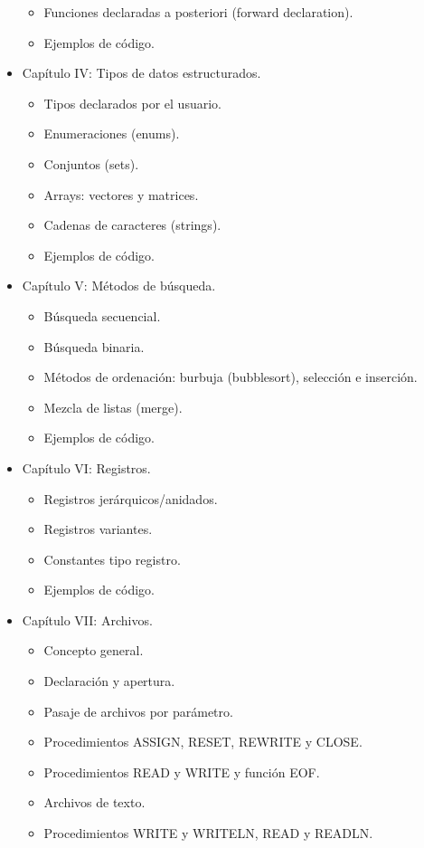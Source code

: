 \documentclass{article}
\begin{document}
\begin{itemize}
\begin{itemize}
	\item Funciones declaradas a posteriori (forward declaration).
	\item Ejemplos de código.
	\end{itemize}	
\item Capítulo IV: Tipos de datos estructurados.
	\begin{itemize}
	\item Tipos declarados por el usuario.
	\item Enumeraciones (enums).
	\item Conjuntos (sets).
	\item Arrays: vectores y matrices.
	\item Cadenas de caracteres (strings).
	\item Ejemplos de código.
	\end{itemize}
\item Capítulo V: Métodos de búsqueda.
	\begin{itemize}
	\item Búsqueda secuencial.
	\item Búsqueda binaria.
	\item Métodos de ordenación: burbuja (bubblesort), selección e inserción.
	\item Mezcla de listas (merge).
	\item Ejemplos de código.
	\end{itemize}
\item Capítulo VI: Registros.
	\begin{itemize}
	\item Registros jerárquicos/anidados.
	\item Registros variantes.
	\item Constantes tipo registro.
	\item Ejemplos de código.
	\end{itemize}
\item Capítulo VII: Archivos.
	\begin{itemize}
	\item Concepto general.
	\item Declaración y apertura.
	\item Pasaje de archivos por parámetro.
	\item Procedimientos ASSIGN, RESET, REWRITE y CLOSE.
	\item Procedimientos READ y WRITE y función EOF.
	\item Archivos de texto.
	\item Procedimientos WRITE y WRITELN, READ y READLN.

\end{itemize}
\end{itemize}
\end{document}
